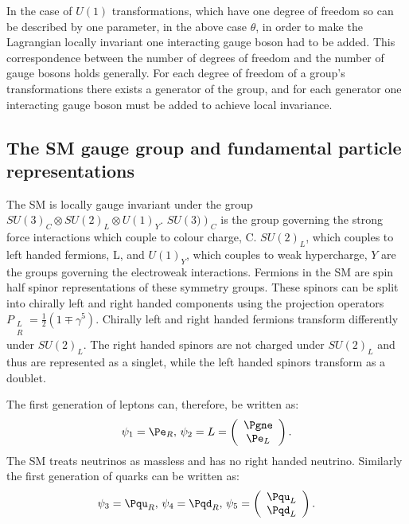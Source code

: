 In the case of $U(1)$ transformations, which have one degree of freedom so can be described by one parameter, in the above case $\theta$, in order to make the Lagrangian locally invariant one interacting gauge boson had to be added. This correspondence between the number of degrees of freedom and the number of gauge bosons holds generally. For each degree of freedom of a group's transformations there exists a generator of the group, and for each generator one interacting gauge boson must be added to achieve local invariance.

\subsection{The SM gauge group and fundamental particle representations}
\label{sec:smgauge}
The \ac{SM} is locally gauge invariant under the group $SU\left(3\right)_{C}\otimes SU\left(2\right)_{L}\otimes U\left(1\right)_{Y}$. $SU\left(3)\right)_{C}$ is the group governing the strong force interactions which couple to colour charge, C. $SU\left(2\right)_{L}$, which couples to left handed fermions, L, and $U\left(1\right)_{Y}$, which couples to weak hypercharge, $Y$ are the groups governing the electroweak interactions. Fermions in the SM are spin half spinor representations of these symmetry groups. These spinors can be split into chirally left and right handed components using the projection operators $P_{\substack{L \\R}}=\frac{1}{2}(1\mp \gamma^{5})$. Chirally left and right handed fermions transform differently under $SU\left(2\right)_{L}$. The right handed spinors are not charged under $SU\left(2\right)_{L}$ and thus are represented as a singlet, while the left handed spinors transform as a doublet.

The first generation of leptons can, therefore, be written as:
\begin{equation}
  \psi_{1}=\Pe_{R},\,\psi_{2}=L=\left(\begin{array}{c} \Pgne \\ \Pe_{L}\end{array}\right).
\end{equation}
The SM treats neutrinos as massless and has no right handed neutrino. Similarly the first generation of quarks can be written as:
\begin{equation}
  \psi_{3}=\Pqu_{R},\,\psi_{4}=\Pqd_{R},\,\psi_{5}=\left(\begin{array}{c} \Pqu_{L} \\ \Pqd_{L}\end{array}\right).
\end{equation}

